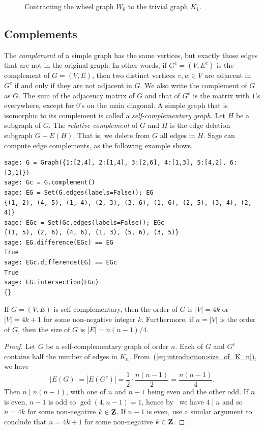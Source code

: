 \begin{figure}[!htbp]
\centering

\caption{Contracting the wheel graph $W_6$ to the trivial graph $K_1$.}
\label{fig:introduction:edge_contraction_W6_to_K1}
\end{figure}



\subsection{Complements}

The \emph{complement} of a simple graph has the same
vertices, but
exactly those edges that are not in the original graph. In other
words, if $G^c = (V, E^c)$ is the complement of
$G = (V,E)$, then two distinct vertices $v,w \in V$ are adjacent in
$G^c$ if and only if they are not adjacent in $G$. We also write the
complement of $G$ as $\overline{G}$. The sum of
the adjacency matrix of $G$ and that of $G^c$ is the matrix with $1$'s
everywhere, except for $0$'s on the main diagonal. A simple graph that
is isomorphic to its complement is called a
\emph{self-complementary graph}. Let
$H$ be a subgraph of $G$. The
\emph{relative complement} of $G$ and $H$
is the edge deletion subgraph $G - E(H)$. That is, we delete from $G$
all edges in $H$. Sage can compute edge complements, as the following
example shows.
%
\begin{lstlisting}
sage: G = Graph({1:[2,4], 2:[1,4], 3:[2,6], 4:[1,3], 5:[4,2], 6:[3,1]})
sage: Gc = G.complement()
sage: EG = Set(G.edges(labels=False)); EG
{(1, 2), (4, 5), (1, 4), (2, 3), (3, 6), (1, 6), (2, 5), (3, 4), (2, 4)}
sage: EGc = Set(Gc.edges(labels=False)); EGc
{(1, 5), (2, 6), (4, 6), (1, 3), (5, 6), (3, 5)}
sage: EG.difference(EGc) == EG
True
sage: EGc.difference(EG) == EGc
True
sage: EG.intersection(EGc)
{}
\end{lstlisting}

\begin{theorem}
If $G = (V, E)$ is self-complementary, then the order of $G$ is
$|V| = 4k$ or $|V| = 4k + 1$ for some non-negative integer
$k$. Furthermore, if $n = |V|$ is the order of $G$, then the size of
$G$ is $|E| = n(n - 1) / 4$.
\end{theorem}

\begin{proof}
Let $G$ be a self-complementary graph of order $n$. Each of $G$ and
$G^c$ contains half the number of edges in
$K_n$. From~(\ref{eq:introduction:size_of_K_n}), we have
\[
|E(G)|
=
|E(G^c)|
=
\frac{1}{2} \cdot \frac{n(n - 1)}{2}
=
\frac{n(n - 1)}{4}.
\]
Then $n \;|\; n(n - 1)$, with one of $n$ and $n - 1$ being even and
the other odd. If $n$ is even, $n - 1$ is odd so $\gcd(4, n-1) = 1$,
hence by~\cite[Theorem~1.9]{Shoup2008} we have $4 \;|\; n$ and so
$n = 4k$ for some non-negative $k \in \mathbf{Z}$. If $n - 1$ is even, use a
similar argument to conclude that $n = 4k + 1$ for some non-negative
$k \in \mathbf{Z}$.
\end{proof}

